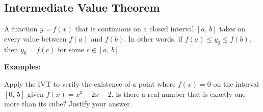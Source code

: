\subsection*{Intermediate Value Theorem}
\begin{tcolorbox}[title= THE INTERMEDIATE VALUE THEOREM,colframe=black,sharp corners,colback=white,colbacktitle=white,coltitle=black,boxrule=1pt]

    A function $y=f(x)$ that is continuous on a closed interval $[a,\,b]$ takes on every value between $f(a)$ and $f(b)$. In other words, if $f(a)\le y_0\le f(b)$, then $y_0=f(c)$ for some $c\in[a,\,b]$.
\end{tcolorbox}
\vspace{.15cm}
\noindent\textbf{Examples:}
\begin{questions}
    \question Apply the IVT to verify the existence of a point where $f(x)=0$ on the interval $[0,\,5]$ given $f(x)=x^3-2x-2$.
    \question Is there a real number that is exactly one more than its cube? Justify your answer.
\end{questions}



\newpage
